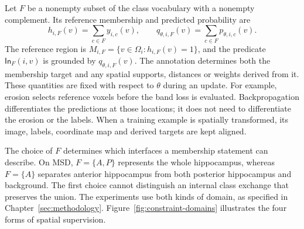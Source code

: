 \documentclass[12pt,a4paper]{article}
\begin{document}
Let $F$ be a nonempty subset of the class vocabulary with a nonempty
complement. Its reference membership and predicted probability are
\begin{equation}
h_{i,F}(v)=\sum_{c\in F}y_{i,c}(v),
\qquad
q_{\theta,i,F}(v)=\sum_{c\in F}p_{\theta,i,c}(v).
\label{eq:constraint-group-membership}
\end{equation}
The reference region is $M_{i,F}=\{v\in\Omega_i:h_{i,F}(v)=1\}$,
and the predicate $\mathsf{In}_F(i,v)$ is grounded by
$q_{\theta,i,F}(v)$. The annotation determines both the membership
target and any spatial supports, distances or weights derived from it.
These quantities are fixed with respect to $\theta$ during an update.
For example, erosion selects reference voxels before the band loss is
evaluated. Backpropagation differentiates the predictions at those
locations; it does not need to differentiate the erosion or the labels.
When a training example is spatially transformed, its image, labels,
coordinate map and derived targets are kept aligned.

The choice of $F$ determines which interfaces a membership statement
can describe. On MSD, $F=\{A,P\}$ represents the whole hippocampus,
whereas $F=\{A\}$ separates anterior hippocampus from both posterior
hippocampus and background. The first choice cannot distinguish an
internal class exchange that preserves the union. The experiments use
both kinds of domain, as specified in Chapter~\ref{sec:methodology}.
Figure~\ref{fig:constraint-domains} illustrates the four forms of
spatial supervision.
\end{document}
